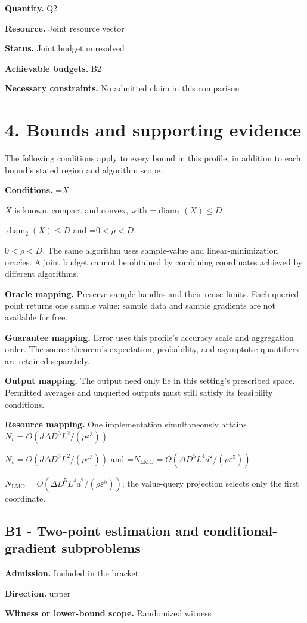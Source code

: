 \documentclass[10pt,a4paper]{article}
\newcommand{\AtlasMath}[1]{\par\begingroup\centering\setbox0=\hbox{$\displaystyle #1$}\ifdim\wd0>1.4\linewidth\typeout{ATLAS WIDE FORMULA: \the\wd0}\fi\ifdim\wd0>\linewidth\resizebox{\linewidth}{!}{\box0}\else\box0\fi\par\endgroup}
\newcommand{\AtlasInlineMath}[1]{\begingroup\setbox0=\hbox{$#1$}\ifdim\wd0>.4\linewidth\endgroup\AtlasMath{#1}\else\endgroup$#1$\fi}
\begin{document}
\textbf{Quantity.} Q2

\textbf{Resource.} Joint resource vector

\textbf{Status.} Joint budget unresolved

\textbf{Achievable budgets.} B2

\textbf{Necessary constraints.} No admitted claim in this comparison

\section{4. Bounds and supporting evidence}
The following conditions apply to every bound in this profile, in addition to each bound's stated region and algorithm scope.

\textbf{Conditions.} \AtlasInlineMath{X} is known, compact and convex, with \AtlasInlineMath{\operatorname{diam}_2(X)\le D} and \AtlasInlineMath{0<\rho<D}. The same algorithm uses sample-value and linear-minimization oracles. A joint budget cannot be obtained by combining coordinates achieved by different algorithms.

\textbf{Oracle mapping.} Preserve sample handles and their reuse limits. Each queried point returns one sample value; sample data and sample gradients are not available for free.

\textbf{Guarantee mapping.} Error uses this profile's accuracy scale and aggregation order. The source theorem's expectation, probability, and asymptotic quantifiers are retained separately.

\textbf{Output mapping.} The output need only lie in this setting's prescribed space. Permitted averages and unqueried outputs must still satisfy its feasibility conditions.

\textbf{Resource mapping.} One implementation simultaneously attains \AtlasInlineMath{N_v=O(d\Delta D^3L^2/(\rho\varepsilon^3))} and \AtlasInlineMath{N_{\mathrm{LMO}}=O(\Delta D^5L^4d^2/(\rho\varepsilon^5))}; the value-query projection selects only the first coordinate.

\subsection{B1 - Two-point estimation and conditional-gradient subproblems}
\textbf{Admission.} Included in the bracket

\textbf{Direction.} upper

\textbf{Witness or lower-bound scope.} Randomized witness
\end{document}
